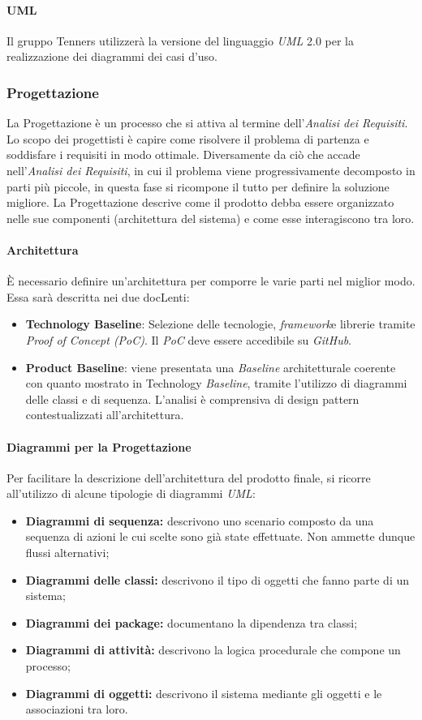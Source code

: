 \paragraph{UML\glo}
Il gruppo Tenners utilizzerà la versione del linguaggio \textit{UML\glo} 2.0 per la realizzazione dei diagrammi dei casi d'uso.
\subsubsection{Progettazione}
La Progettazione è un processo che si attiva al termine dell'\textit{Analisi dei Requisiti\docs}. Lo scopo dei progettisti è capire come risolvere il problema di partenza e soddisfare i requisiti in modo ottimale. Diversamente da ciò che accade nell'\textit{Analisi dei Requisiti\docs}, in cui il problema viene progressivamente decomposto in parti più piccole, in questa fase si ricompone il tutto per definire la soluzione migliore. La Progettazione descrive come il prodotto debba essere organizzato nelle sue componenti (architettura del sistema) e come esse interagiscono tra loro.
\paragraph{Architettura}
È necessario definire un'architettura per comporre le varie parti nel miglior modo. Essa sarà descritta nei due docLenti:
\begin{itemize}
  \item \textbf{Technology Baseline}: Selezione delle tecnologie, \textit{framework}\glo e librerie tramite \textit{Proof of Concept (PoC)\glos}. Il \textit{PoC\glo} deve essere accedibile su \textit{GitHub\glos}.
  \item \textbf{Product Baseline}: viene presentata una \textit{Baseline\glo} architetturale coerente con quanto mostrato in Technology \textit{Baseline\glos}, tramite l'utilizzo di diagrammi delle classi e di sequenza. L'analisi è comprensiva di design pattern contestualizzati all'architettura.
\end{itemize}
\paragraph{Diagrammi per la Progettazione}
Per facilitare la descrizione dell'architettura del prodotto finale, si ricorre all'utilizzo di alcune tipologie di diagrammi \textit{UML\glos}:
\begin{itemize}
	\item \textbf{Diagrammi di sequenza:} descrivono uno scenario composto da una sequenza di azioni le cui scelte sono già state effettuate. Non ammette dunque flussi alternativi;
	\item \textbf{Diagrammi delle classi:} descrivono il tipo di oggetti che fanno parte di un sistema;
	\item \textbf{Diagrammi dei package:} documentano la dipendenza tra classi;
	\item \textbf{Diagrammi di attività:} descrivono la logica procedurale che compone un processo;
	\item \textbf{Diagrammi di oggetti:} descrivono il sistema mediante gli oggetti e le associazioni tra loro.
\end{itemize}
